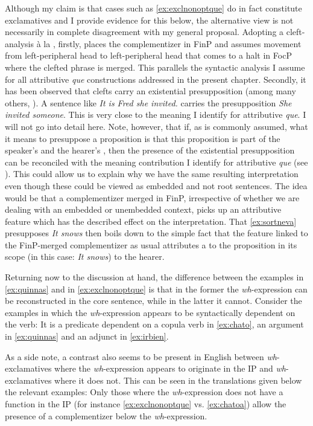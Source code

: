 Although my claim is that cases such as \eqref{ex:exclnonoptque}  do in fact constitute exclamatives and I provide  evidence for this below,  the alternative view is not necessarily in complete disagreement with my general proposal. Adopting a cleft-analysis à la \citeauthor{Belletti2009}, firstly, places the complementizer in FinP and assumes movement from left-peripheral head to left-peripheral head that comes to a halt in FocP where the clefted phrase is merged. This parallels the syntactic analysis  I assume for all attributive \emph{que} constructions addressed in the present chapter. Secondly, it has been observed that clefts carry  an existential presupposition (among many others, \citealt{Buering2013}). A sentence like \emph{It is Fred she invited.}  carries the presupposition  \emph{She invited someone}. This is very close to the meaning I identify for attributive \emph{que}. I will not go into detail here. Note, however, that if, as is commonly assumed, what it means to presuppose a proposition is  that this proposition is part of the speaker's and the hearer's , then the presence of the existential presupposition  can be reconciled with the meaning contribution I identify for attributive \emph{que} (see ). This could allow us to explain why we have the same resulting interpretation even though these could be viewed as embedded and not root sentences. The idea would be  that a complementizer merged in FinP, irrespective of whether we are dealing with an embedded or unembedded context, picks up an attributive feature which has the described effect on the interpretation. That \eqref{ex:sortneva} presupposes  \emph{It snows} then  boils down to the simple fact that the feature linked to the FinP-merged complementizer as usual  attributes a  to the  proposition in its scope (in this case: \emph{It snows}) to the hearer.

Returning now to the  discussion at hand, the difference between the examples in \eqref{ex:quinnas} and in \eqref{ex:exclnonoptque} is that in the former  the \textit{wh}-expression can be reconstructed in the core sentence, while in the latter it cannot. Consider the examples in which the \textit{wh}-expression appears to be syntactically dependent on the verb: It is a predicate dependent on a copula verb in \eqref{ex:chato},  an argument in \eqref{ex:quinnas} and an adjunct in  \eqref{ex:irbien}.

As a side note, a contrast also seems to be present in English between \textit{wh}-exclamatives where the \textit{wh}-expression appears to originate in the IP and \textit{wh}-exclamatives where  it does not. This can be seen in the translations given below the relevant examples: Only those where the \textit{wh}-expression does not  have a function in the IP (for instance \eqref{ex:exclnonoptque} vs. \eqref{ex:chatoa}) allow the presence of a complementizer below the \textit{wh}-expression.\largerpage


